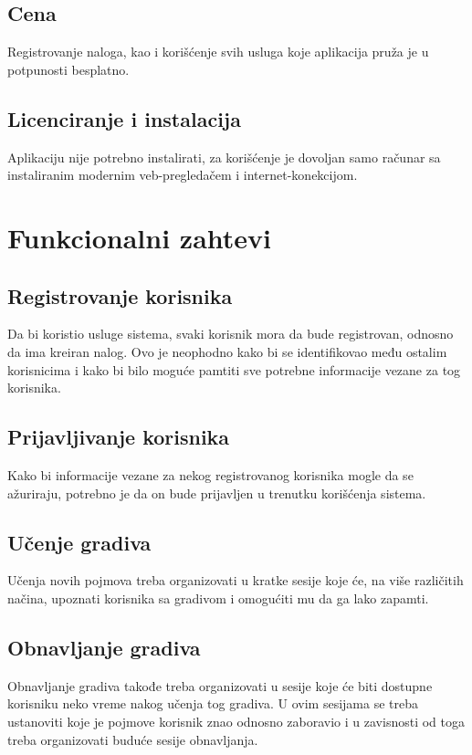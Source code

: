 \section{Cena}
Registrovanje naloga, kao i korišćenje svih usluga koje aplikacija pruža je u potpunosti besplatno.

\section{Licenciranje i instalacija}
Aplikaciju nije potrebno instalirati, za korišćenje je dovoljan samo računar sa instaliranim modernim veb-pregledačem i internet-konekcijom.

\chapter{Funkcionalni zahtevi}

\section{Registrovanje korisnika}
Da bi koristio usluge sistema, svaki korisnik mora da bude registrovan, odnosno da ima kreiran nalog. Ovo je neophodno kako bi se identifikovao među ostalim korisnicima i kako bi bilo moguće pamtiti sve potrebne informacije vezane za tog korisnika.

\section{Prijavljivanje korisnika}
Kako bi informacije vezane za nekog registrovanog korisnika mogle da se ažuriraju, potrebno je da on bude prijavljen u trenutku korišćenja sistema.

\section{Učenje gradiva}
\label{sec:ucenje-gradiva}
Učenja novih pojmova treba organizovati u kratke sesije koje će, na više različitih načina, upoznati korisnika sa gradivom i omogućiti mu da ga lako zapamti.

\section{Obnavljanje gradiva}
\label{sec:obnavljanje-gradiva}
Obnavljanje gradiva takođe treba organizovati u sesije koje će biti dostupne korisniku neko vreme nakog učenja tog gradiva. U ovim sesijama se treba ustanoviti koje je pojmove korisnik znao odnosno zaboravio i u zavisnosti od toga treba organizovati buduće sesije obnavljanja.

